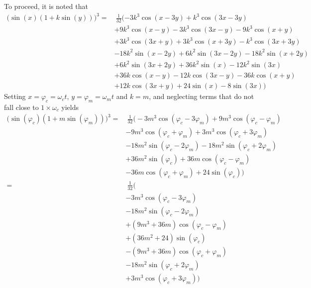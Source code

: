\documentclass[12pt]{article}
\begin{document}
To proceed, it is noted that 
\begin{equation}
\begin{aligned}
\Big(\sin(x) (1 + k\sin(y)) \Big)^3 = & \ \frac{1}{32} (-3 k^3 \cos(x - 3 y) + k^3 \cos(3 x - 3 y) \\
 & + 9 k^3 \cos(x - y) - 3 k^3 \cos(3 x - y) - 9 k^3 \cos(x + y) \\
 & + 3 k^3 \cos(3 x + y) + 3 k^3 \cos(x + 3 y) - k^3 \cos(3 x + 3 y) \\
 & - 18 k^2 \sin(x - 2 y) + 6 k^2 \sin(3 x - 2 y) - 18 k^2 \sin(x + 2 y) \\
 & + 6 k^2 \sin(3 x + 2 y) + 36 k^2 \sin(x) - 12 k^2 \sin(3 x) \\
 & + 36 k \cos(x - y) - 12 k \cos(3 x - y) - 36 k \cos(x + y) \\
 & + 12 k \cos(3 x + y) + 24 \sin(x) - 8 \sin(3 x))
\end{aligned}
\end{equation}
Setting $x = \varphi_c = \omega_c t$, $y = \varphi_m = \omega_m t$ and $k=m$, and neglecting terms that do not fall close to $1 \times \omega_c$ yields
\begin{equation}
\begin{aligned}
\Big(\sin(\varphi_c) (1 + m\sin(\varphi_m)) \Big)^3 = & \ \frac{1}{32} \Big(-3 m^3 \cos(\varphi_c - 3 \varphi_m) + 9 m^3 \cos(\varphi_c - \varphi_m) \\
 & - 9 m^3 \cos(\varphi_c + \varphi_m) + 3 m^3 \cos(\varphi_c + 3 \varphi_m)  \\
 & - 18 m^2 \sin(\varphi_c - 2 \varphi_m)  - 18 m^2 \sin(\varphi_c + 2 \varphi_m) \\
 &  + 36 m^2 \sin(\varphi_c) + 36 m \cos(\varphi_c - \varphi_m) \\
 & - 36 m \cos(\varphi_c + \varphi_m) + 24 \sin(\varphi_c) \Big) \\
= & \ \frac{1}{32} \Big( \\
& -3 m^3 \cos(\varphi_c - 3 \varphi_m) \\
& -18 m^2 \sin(\varphi_c - 2 \varphi_m) \\
& + (9 m^3 + 36m) \cos(\varphi_c - \varphi_m) \\
& + (36 m^2 +24)\sin(\varphi_c) \\
& - (9 m^3 +36 m) \cos(\varphi_c + \varphi_m) \\
& - 18 m^2 \sin(\varphi_c + 2 \varphi_m) \\
& + 3 m^3 \cos(\varphi_c + 3 \varphi_m) \Big)
\end{aligned}
\end{equation}
\end{document}
